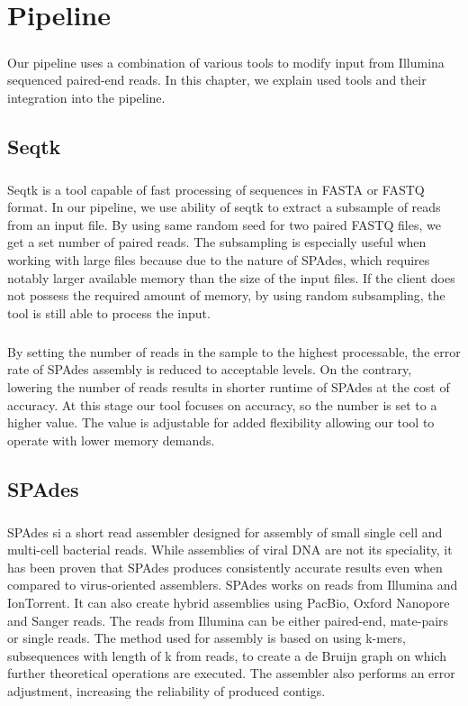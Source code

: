 \chapter{Pipeline}

\label{kap:pipeline} %
\paragraph*{}
Our pipeline uses a combination of various tools to modify input from Illumina sequenced paired-end reads. In this chapter, we explain used tools and their integration into the pipeline. 
\section{Seqtk}
\paragraph*{}
Seqtk\cite{li2012seqtk} is a tool capable of fast processing of sequences in FASTA or FASTQ format. In our pipeline, we use ability of seqtk to extract a subsample of reads from an input file. By using same random seed for two paired FASTQ files, we get a set number of paired reads. The subsampling is especially useful when working with large files because due to the nature of SPAdes, which requires notably larger available memory than the size of the input files. If the client does not possess the required amount of memory, by using random subsampling, the tool is still able to process the input. 
\paragraph*{}
By setting the number of reads in the sample to the highest processable, the error rate of SPAdes assembly is reduced to acceptable levels. On the contrary, lowering the number of reads results in shorter runtime of SPAdes at the cost of accuracy. At this stage our tool focuses on accuracy, so the number is set to a higher value. The value is adjustable for added flexibility allowing our tool to operate with lower memory demands.

\section{SPAdes}
\paragraph*{}
SPAdes\cite{bankevich2012spades} si a short read assembler designed for assembly of small single cell and multi-cell bacterial reads. While assemblies of viral DNA are not its speciality, it has been proven that SPAdes produces consistently accurate results even when compared to virus-oriented assemblers. SPAdes works on reads from Illumina and IonTorrent. It can also create hybrid assemblies using PacBio, Oxford Nanopore and Sanger reads. The reads from Illumina can be either paired-end, mate-pairs or single reads. The method used for assembly is based on using k-mers, subsequences with length of k from reads, to create a de Bruijn graph on which further theoretical operations are executed. The assembler also performs an error adjustment, increasing the reliability of produced contigs.
